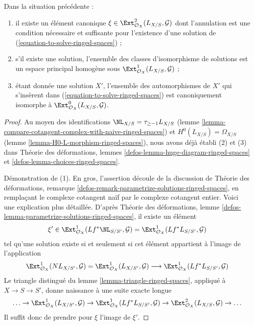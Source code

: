 \begin{lemma}
\label{lemma-find-obstruction-ringed-spaces}
Dans la situation précédente :
\begin{enumerate}
\item il existe un élément canonique
$\xi \in \Ext^2_{\mathcal{O}_X}(L_{X/S}, \mathcal{G})$
dont l'annulation est une condition nécessaire et suffisante pour l'existence
d'une solution de (\ref{equation-to-solve-ringed-spaces}) ;
\item s'il existe une solution, l'ensemble des classes d'isomorphisme de
solutions est un espace principal homogène sous
$\Ext^1_{\mathcal{O}_X}(L_{X/S}, \mathcal{G})$ ;
\item étant donnée une solution $X'$, l'ensemble des automorphismes de $X'$
qui s'insèrent dans (\ref{equation-to-solve-ringed-spaces}) est canoniquement
isomorphe à $\Ext^0_{\mathcal{O}_X}(L_{X/S}, \mathcal{G})$.
\end{enumerate}
\end{lemma}

\begin{proof}
Au moyen des identifications $\NL_{X/S} = \tau_{\geq -1}L_{X/S}$ (lemme
\ref{lemma-compare-cotangent-complex-with-naive-ringed-spaces}) et
$H^0(L_{X/S}) = \Omega_{X/S}$
(lemme \ref{lemma-H0-L-morphism-ringed-spaces}), nous avons déjà établi (2) et
(3) dans Théorie des déformations, lemmes
\ref{defos-lemma-huge-diagram-ringed-spaces} et
\ref{defos-lemma-choices-ringed-spaces}.

\medskip\noindent
Démonstration de (1). En gros, l'assertion découle de la discussion de Théorie
des déformations, remarque
\ref{defos-remark-parametrize-solutions-ringed-spaces}, en remplaçant le
complexe cotangent naïf par le complexe cotangent entier. Voici une explication
plus détaillée. D'après Théorie des déformations, lemme
\ref{defos-lemma-parametrize-solutions-ringed-spaces}, il existe un élément
$$
\xi' \in
\Ext^1_{\mathcal{O}_X}(Lf^*\NL_{S/S'}, \mathcal{G}) =
\Ext^1_{\mathcal{O}_X}(Lf^*L_{S/S'}, \mathcal{G})
$$
tel qu'une solution existe si et seulement si cet élément appartient à l'image
de l'application
$$
\Ext^1_{\mathcal{O}_X}(NL_{X/S'}, \mathcal{G}) =
\Ext^1_{\mathcal{O}_X}(L_{X/S'}, \mathcal{G})
\longrightarrow
\Ext^1_{\mathcal{O}_X}(Lf^*L_{S/S'}, \mathcal{G})
$$
Le triangle distingué du lemme \ref{lemma-triangle-ringed-spaces}, appliqué à
$X \to S \to S'$, donne naissance à une suite exacte longue
$$
\ldots \to
\Ext^1_{\mathcal{O}_X}(L_{X/S'}, \mathcal{G}) \to
\Ext^1_{\mathcal{O}_X}(Lf^*L_{S/S'}, \mathcal{G}) \to
\Ext^2_{\mathcal{O}_X}(L_{X/S}, \mathcal{G}) \to \ldots
$$
Il suffit donc de prendre pour $\xi$ l'image de $\xi'$.
\end{proof}










